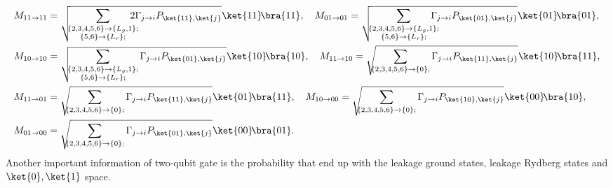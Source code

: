 \documentclass[11pt]{article}
\begin{document}
\begin{align*}
     M_{11 \to 11} &=\sqrt{\!\!\sum_{\substack{
     \{2,3,4,5,6\} \to \{L_g ,1\};\\
     \{5,6\} \to \{L_r\};
     }}\!\!\!\!\!\!2\Gamma_{j \to i} P_{\ket{11},\ket{j}}}\ket{11}\!\bra{11}, \quad
     M_{01 \to 01} =\sqrt{\!\!\sum_{\substack{
     \{2,3,4,5,6\} \to \{L_g ,1\};\\
     \{5,6\} \to \{L_r\};
     }}\!\!\!\!\!\!\Gamma_{j \to i} P_{\ket{01},\ket{j}}}\ket{01}\!\bra{01},\\
     M_{10 \to 10} &=\sqrt{\!\!\sum_{\substack{
     \{2,3,4,5,6\} \to \{L_g ,1\};\\
     \{5,6\} \to \{L_r\};
     }}\Gamma_{j \to i} P_{\ket{01},\ket{j}}}\ket{10}\!\bra{10},\quad
     M_{11 \to 10} =\sqrt{\!\!\!\sum_{ \substack{\{2,3,4,5,6\} \to \{0\};
     }}\Gamma_{j \to i} P_{\ket{11},\ket{j}}}\ket{10}\!\bra{11},\\
     M_{11 \to 01} &=\sqrt{\!\!\!\sum_{ \substack{\{2,3,4,5,6\} \to \{0\};
     }}\Gamma_{j \to i} P_{\ket{11},\ket{j}}}\ket{01}\!\bra{11},\quad
      M_{10 \to 00} =\sqrt{\!\!\!\sum_{ \substack{\{2,3,4,5,6\} \to \{0\};
     }}\Gamma_{j \to i} P_{\ket{10},\ket{j}}}\ket{00}\!\bra{10},\\
      M_{01 \to 00} &=\sqrt{\!\!\!\sum_{ \substack{\{2,3,4,5,6\} \to \{0\};
     }}\Gamma_{j \to i} P_{\ket{01},\ket{j}}}\ket{00}\!\bra{01}.
\end{align*}
Another important information of two-qubit gate is the probability that end up with the leakage ground states, leakage Rydberg states and $\ket{0}, \ket{1}$ space.  


\end{document}
